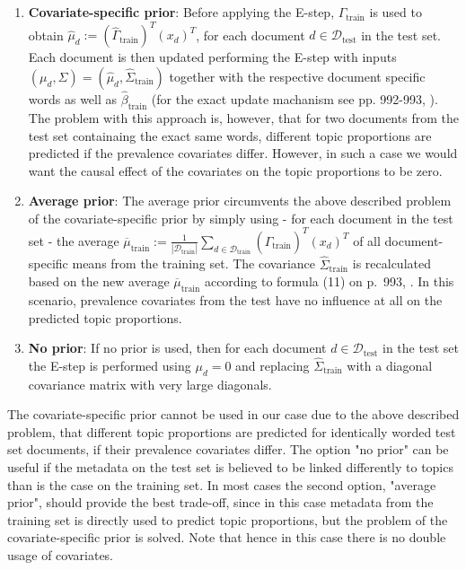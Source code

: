 \begin{enumerate}
\item \textbf{Covariate-specific prior}: Before applying the E-step, $\hat{\Gamma}_{\text{train}}$ is used to obtain $\hat{\mu}_d := (\hat{\Gamma}_{\text{train}})^T(x_d)^T$, for each document $d \in \mathcal{D}_{\text{test}}$ in the test set. Each document is then updated performing the E-step with inputs $({\mu}_d, \Sigma) = (\hat{\mu}_d, \hat{\Sigma}_{\text{train}})$ together with the respective document specific words as well as $\hat{\beta}_{\text{train}}$ (for the exact update machanism see pp. 992-993, \cite{roberts2013structural}). The problem with this approach is, however, that for two documents from the test set containaing the exact same words, different topic proportions are predicted if the prevalence covariates differ. However, in such a case we would want the causal effect of the covariates on the topic proportions to be zero.
\item \textbf{Average prior}: The average prior circumvents the above described problem of the covariate-specific prior by simply using - for each document in the test set - the average $\overline{\mu}_{\text{train}} := \frac{1}{|\mathcal{D}_{\text{train}}|}\sum_{d \in \mathcal{D}_{\text{train}}} (\hat{\Gamma}_{\text{train}})^T(x_d)^T$ of all document-specific means from the training set. The covariance $\hat{\Sigma}_{\text{train}}$ is recalculated based on the new average $\overline{\mu}_{\text{train}}$ according to formula (11) on p.\ 993, \cite{roberts2013structural}. In this scenario, prevalence covariates from the test have no influence at all on the predicted topic proportions. 
\item \textbf{No prior}: If no prior is used, then for each document $d \in \mathcal{D}_{\text{test}}$ in the test set the E-step is performed using $\mu_d=0$ and replacing $\hat{\Sigma}_{\text{train}}$ with a diagonal covariance matrix with very large diagonals.
\end{enumerate}

The covariate-specific prior cannot be used in our case due to the above described problem, that different topic proportions are predicted for identically worded test set documents, if their prevalence covariates differ. The option "no prior" can be useful if the metadata on the test set is believed to be linked differently to topics than is the case on the training set. In most cases the second option, "average prior", should provide the best trade-off, since in this case metadata from the training set is directly used to predict topic proportions, but the problem of the covariate-specific prior is solved. Note that hence in this case there is no double usage of covariates.

